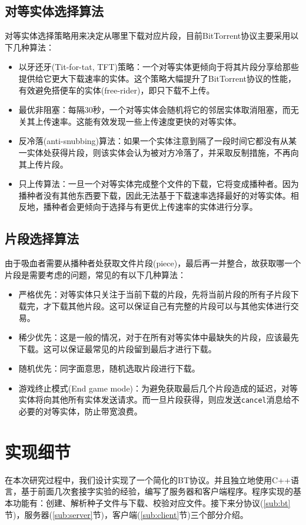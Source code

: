 \documentclass[thesis]{thesis}
\begin{document}
	\subsection{对等实体选择算法}
	\label{sub:peer_alg}
	对等实体选择策略用来决定从哪里下载对应片段，目前BitTorrent协议主要采用以下几种算法\cite{survey_bt}：
	\begin{itemize}
		\item 以牙还牙(Tit-for-tat, TFT)策略：一个对等实体更倾向于将其片段分享给那些提供给它更大下载速率的实体。这个策略大幅提升了BitTorrent协议的性能，有效避免搭便车的实体(free-rider)，即只下载不上传。
		\item 最优非阻塞：每隔30秒，一个对等实体会随机将它的邻居实体取消阻塞，而无关其上传速率。这能有效发现一些上传速度更快的对等实体。
		\item 反冷落(anti-snubbing)算法：如果一个实体注意到隔了一段时间它都没有从某一实体处获得片段，则该实体会认为被对方冷落了，并采取反制措施，不再向其上传片段。
		\item 只上传算法：一旦一个对等实体完成整个文件的下载，它将变成播种者。因为播种者没有其他东西要下载，因此无法基于下载速率选择最好的对等实体。相反地，播种者会更倾向于选择与有更优上传速率的实体进行分享。
	\end{itemize}
	
	\subsection{片段选择算法}
	\label{sub:sel_alg}
	由于吸血者需要从播种者处获取文件片段(piece)，最后再一并整合，故获取哪一个片段是需要考虑的问题，常见的有以下几种算法：
	\begin{itemize}
		\item 严格优先：对等实体只关注于当前下载的片段，先将当前片段的所有子片段下载完，才下载其他片段。这可以保证自己有完整的片段可以与其他实体进行交易。
		\item 稀少优先：这是一般的情况，对于在所有对等实体中最缺失的片段，应该最先下载。这可以保证最常见的片段留到最后才进行下载。
		\item 随机优先：同字面意思，随机选取片段进行下载。
		\item 游戏终止模式(End game mode)：为避免获取最后几个片段造成的延迟，对等实体将向其他所有实体发送请求。而一旦片段获得，则应发送\verb'cancel'消息给不必要的对等实体，防止带宽浪费。
	\end{itemize}
	
	\section{实现细节}
	在本次研究过程中，我们设计实现了一个简化的BT协议。并且独立地使用C++语言，基于前面几次套接字实验的经验，编写了服务器和客户端程序。程序实现的基本功能有：创建、解析种子文件与下载、校验对应文件。接下来分协议(\ref{sub:bt}节)，服务器(\ref{sub:server}节)，客户端(\ref{sub:client}节)三个部分介绍。
\end{document}
